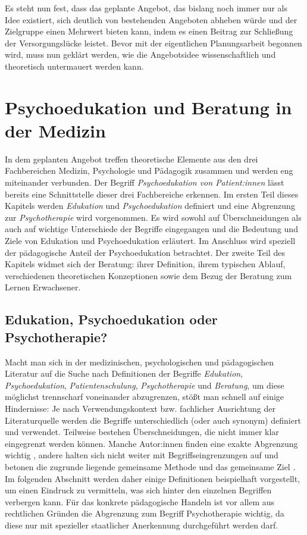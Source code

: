 \documentclass[
  twoside,
  parskip=half-,
  paper=176mm:246mm,
  BCOR=14mm,
  DIV=14,
]{scrreprt}
\begin{document}
Es steht nun fest, dass das geplante Angebot, das bislang noch immer nur als Idee existiert, sich deutlich von bestehenden Angeboten abheben würde und der Zielgruppe einen Mehrwert bieten kann, indem es einen Beitrag zur Schließung der Versorgungslücke leistet. Bevor mit der eigentlichen Planungsarbeit begonnen wird, muss nun geklärt werden, wie die Angebotsidee wissenschaftlich und theoretisch untermauert werden kann.


\chapter{Psychoedukation und Beratung in der Medizin}\label{psychoedukation}
In dem geplanten Angebot treffen theoretische Elemente aus den drei Fachbereichen Medizin, Psychologie und Pädagogik zusammen und werden eng miteinander verbunden. Der Begriff \textit{Psychoedukation von Patient:innen} lässt bereits eine Schnittstelle dieser drei Fachbereiche erkennen. Im ersten Teil dieses Kapitels werden \textit{Edukation} und \textit{Psychoedukation} definiert und eine Abgrenzung zur \textit{Psychotherapie} wird vorgenommen. Es wird sowohl auf Überschneidungen als auch auf wichtige Unterschiede der Begriffe eingegangen und die Bedeutung und Ziele von Edukation und Psychoedukation erläutert. Im Anschluss wird speziell der pädagogische Anteil der Psychoedukation betrachtet. Der zweite Teil des Kapitels widmet sich der Beratung: ihrer Definition, ihrem typischen Ablauf, verschiedenen theoretischen Konzeptionen sowie dem Bezug der Beratung zum Lernen Erwachsener.

\section{Edukation, Psychoedukation oder Psychotherapie?}

Macht man sich in der medizinischen, psychologischen und pädagogischen Literatur auf die Suche nach Definitionen der Begriffe \textit{Edukation}, \textit{Psychoedukation}, \textit{Patientenschulung}, \textit{Psychotherapie} und \textit{Beratung}, um diese möglichst trennscharf voneinander abzugrenzen, stößt man schnell auf einige Hindernisse: Je nach Verwendungskontext bzw. fachlicher Ausrichtung der Literaturquelle werden die Begriffe unterschiedlich (oder auch synonym) definiert und verwendet. Teilweise bestehen Überschneidungen, die nicht immer klar eingegrenzt werden können. Manche Autor:innen finden eine exakte Abgrenzung wichtig \autocite[vgl.][897]{integrativePsycho}, andere halten sich nicht weiter mit Begriffseingrenzungen auf und betonen die zugrunde liegende gemeinsame Methode und das gemeinsame Ziel \autocite[vgl.][17]{rogers1942}. Im folgenden Abschnitt werden daher einige Definitionen beispielhaft vorgestellt, um einen Eindruck zu vermitteln, was sich hinter den einzelnen Begriffen verbergen kann. Für das konkrete pädagogische Handeln ist vor allem aus rechtlichen Gründen die Abgrenzung zum Begriff Psychotherapie wichtig, da diese nur mit spezieller staatlicher Anerkennung durchgeführt werden darf.
\end{document}
